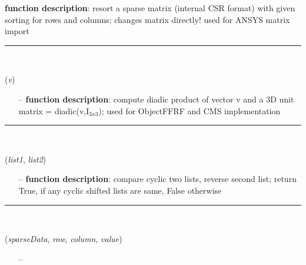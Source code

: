 \begin{itemize}[leftmargin=1.4cm]
\begin{itemize}[leftmargin=1.4cm]
\begin{itemize}[leftmargin=1.4cm]
\begin{itemize}[leftmargin=0.5cm]
\begin{itemize}[leftmargin=1.4cm]
\begin{itemize}[leftmargin=1.4cm]
\begin{itemize}[leftmargin=0.5cm]
\begin{itemize}[leftmargin=0.7cm]
{\bf function description}: resort a sparse matrix (internal CSR format) with given sorting for rows and columns; changes matrix directly! used for ANSYS matrix import
\vspace{12pt}\end{itemize}
%
\noindent\rule{8cm}{0.75pt}\vspace{1pt} \\ 
\begin{flushleft}
\label{sec:FEM:VectorDiadicUnitMatrix3D}
({\it v})
\end{flushleft}
\setlength{\itemindent}{0.7cm}
\begin{itemize}[leftmargin=0.7cm]
\item[--]
{\bf function description}: compute diadic product of vector v and a 3D unit matrix = diadic(v,I$_{3x3}$); used for ObjectFFRF and CMS implementation
\vspace{12pt}\end{itemize}
%
\noindent\rule{8cm}{0.75pt}\vspace{1pt} \\ 
\begin{flushleft}
\label{sec:FEM:CyclicCompareReversed}
({\it list1}, {\it list2})
\end{flushleft}
\setlength{\itemindent}{0.7cm}
\begin{itemize}[leftmargin=0.7cm]
\item[--]
{\bf function description}: compare cyclic two lists, reverse second list; return True, if any cyclic shifted lists are same, False otherwise
\vspace{12pt}\end{itemize}
%
\noindent\rule{8cm}{0.75pt}\vspace{1pt} \\ 
\begin{flushleft}
\label{sec:FEM:AddEntryToCompressedRowSparseArray}
({\it sparseData}, {\it row}, {\it column}, {\it value})
\end{flushleft}
\setlength{\itemindent}{0.7cm}
\begin{itemize}[leftmargin=0.7cm]
\item[--]

\end{itemize}
\end{itemize}
\end{itemize}
\end{itemize}
\end{itemize}
\end{itemize}
\end{itemize}
\end{itemize}
